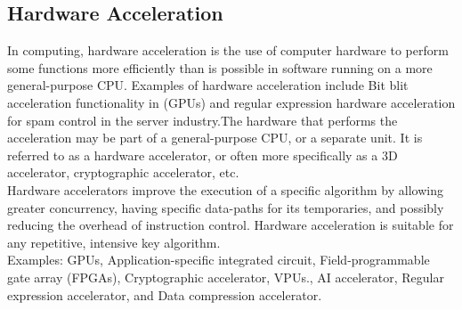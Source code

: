 \subsection{Hardware Acceleration}
In computing, hardware acceleration is the use of computer hardware to perform some functions more efficiently than is possible in software running on a more general-purpose CPU. Examples of hardware acceleration include Bit blit acceleration functionality in (GPUs) and regular expression hardware acceleration for spam control in the server industry.The hardware that performs the acceleration may be part of a general-purpose CPU, or a separate unit. It is referred to as a hardware accelerator, or often more specifically as a 3D accelerator, cryptographic accelerator, etc.\cite{web010}\\
Hardware accelerators improve the execution of a specific algorithm by allowing greater concurrency, having specific data-paths for its temporaries, and possibly reducing the overhead of instruction control.
Hardware acceleration is suitable for any repetitive, intensive key algorithm.\\
Examples: GPUs, Application-specific integrated circuit, Field-programmable gate array (FPGAs), Cryptographic accelerator, VPUs.,
AI accelerator, Regular expression accelerator, and Data compression accelerator.
